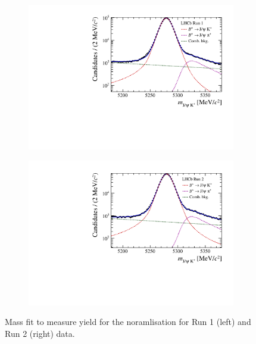 \begin{figure}[htbp]
    \centering
   \begin{subfigure}[b]{0.4\textwidth}
        \includegraphics[width=  \textwidth]{./Figs/BFAnalysis/BuJpsiK_Run1.pdf}
    \end{subfigure}
    \begin{subfigure}[b]{0.4\textwidth}
       \includegraphics[width=\textwidth]{./Figs/BFAnalysis/BuJpsiK_Run2.pdf}
   \end{subfigure}
    \caption{ Mass fit to measure \bujpsik yield for the noramlisation for Run 1 (left) and Run 2 (right) data.}
    \label{fig:Bujpsikyield}
\end{figure}


